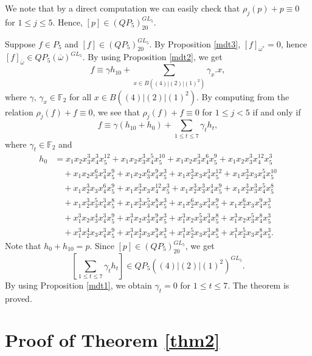 \documentclass[reqno]{amsart}
\theoremstyle{plain}
\theoremstyle{definition}
\theoremstyle{plain}
\theoremstyle{definition}
\numberwithin{equation}{section}
\begin{document}
\smallskip
We note that by a direct computation we can easily check that $\rho_j(p) + p \equiv 0$ for $1 \leqslant j \leqslant 5$. Hence, $[p]\in (QP_5)_{20}^{GL_5}$.

Suppose $f \in P_5$ and $[f] \in (QP_5)_{20}^{GL_5}$. By Proposition \ref{mdt3}, $[f]_{\omega^*} = 0$, hence $[f]_{\overline{\omega}}\in QP_5(\overline{\omega})^{GL_5}$. By using Proposition \ref{mdt2}, we get 
$$f \equiv \gamma h_{10} + \sum_{x\in B((4)|(2)|(1)^2)}\gamma_x.x,$$
where $\gamma,\, \gamma_x \in \mathbb F_2$ for all $x\in B((4)|(2)|(1)^2)$. By computing from the relation $\rho_j(f)+f \equiv 0$, we see that $\rho_j(f)+f \equiv 0$ for $1 \leqslant j < 5$ if and only if 
$$ f \equiv \gamma(h_{10}+h_0) + \sum_{1 \leqslant t \leqslant 7}\gamma_th_t,$$
where $\gamma_t \in \mathbb F_2$ and
\begin{align*}
h_0 &= x_1x_2x_3^{3}x_4^{3}x_5^{12} + x_1x_2x_3^{3}x_4^{5}x_5^{10} + x_1x_2x_3^{3}x_4^{6}x_5^{9} + x_1x_2x_3^{3}x_4^{12}x_5^{3}\\ 
&\quad + x_1x_2x_3^{6}x_4^{3}x_5^{9} + x_1x_2x_3^{6}x_4^{9}x_5^{3} + x_1x_2^{3}x_3x_4^{3}x_5^{12} + x_1x_2^{3}x_3x_4^{5}x_5^{10}\\ 
&\quad  + x_1x_2^{3}x_3x_4^{6}x_5^{9} + x_1x_2^{3}x_3x_4^{12}x_5^{3}+ x_1x_2^{3}x_3^{3}x_4^{4}x_5^{9} + x_1x_2^{3}x_3^{3}x_4^{5}x_5^{8}\\ 
&\quad  + x_1x_2^{3}x_3^{5}x_4^{3}x_5^{8} + x_1x_2^{3}x_3^{5}x_4^{8}x_5^{3} + x_1x_2^{6}x_3x_4^{3}x_5^{9} + x_1x_2^{6}x_3x_4^{9}x_5^{3}\\ 
&\quad  + x_1^{3}x_2x_3^{4}x_4^{3}x_5^{9} + x_1^{3}x_2x_3^{4}x_4^{9}x_5^{3} + x_1^{3}x_2x_3^{5}x_4^{3}x_5^{8} + x_1^{3}x_2x_3^{5}x_4^{8}x_5^{3}\\ 
&\quad + x_1^{3}x_2^{4}x_3x_4^{3}x_5^{9} + x_1^{3}x_2^{4}x_3x_4^{9}x_5^{3} + x_1^{3}x_2^{5}x_3x_4^{3}x_5^{8} + x_1^{3}x_2^{5}x_3x_4^{8}x_5^{3}.
\end{align*}
Note that $h_0+h_{10} = p$. Since $[p]\in (QP_5)_{20}^{GL_5}$, we get $$[\sum_{1 \leqslant t \leqslant 7}\gamma_th_t] \in QP_5((4)|(2)|(1)^2)^{GL_5}.$$ By using Proposition \ref{mdt1}, we obtain $\gamma_t = 0$ for $1 \leqslant t \leqslant 7$. The theorem is proved.



\section{Proof of Theorem \ref{thm2}}\label{s4}
\setcounter{equation}{0}
\end{document}
